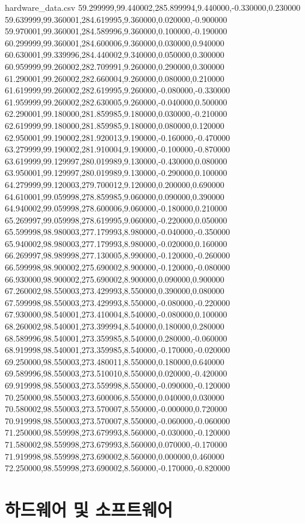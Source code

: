 \begin{filecontents}{hardware_data.csv}
59.299999,99.440002,285.899994,9.440000,-0.330000,0.230000
59.639999,99.360001,284.619995,9.360000,0.020000,-0.900000
59.970001,99.360001,284.589996,9.360000,0.100000,-0.190000
60.299999,99.360001,284.600006,9.360000,0.030000,0.940000
60.630001,99.339996,284.440002,9.340000,0.050000,0.300000
60.959999,99.260002,282.709991,9.260000,0.290000,0.300000
61.290001,99.260002,282.660004,9.260000,0.080000,0.210000
61.619999,99.260002,282.619995,9.260000,-0.080000,-0.330000
61.959999,99.260002,282.630005,9.260000,-0.040000,0.500000
62.290001,99.180000,281.859985,9.180000,0.030000,-0.210000
62.619999,99.180000,281.859985,9.180000,0.080000,0.120000
62.950001,99.190002,281.920013,9.190000,-0.160000,-0.470000
63.279999,99.190002,281.910004,9.190000,-0.100000,-0.870000
63.619999,99.129997,280.019989,9.130000,-0.430000,0.080000
63.950001,99.129997,280.019989,9.130000,-0.290000,0.100000
64.279999,99.120003,279.700012,9.120000,0.200000,0.690000
64.610001,99.059998,278.859985,9.060000,0.090000,0.390000
64.940002,99.059998,278.600006,9.060000,-0.180000,0.210000
65.269997,99.059998,278.619995,9.060000,-0.220000,0.050000
65.599998,98.980003,277.179993,8.980000,-0.040000,-0.350000
65.940002,98.980003,277.179993,8.980000,-0.020000,0.160000
66.269997,98.989998,277.130005,8.990000,-0.120000,-0.260000
66.599998,98.900002,275.690002,8.900000,-0.120000,-0.080000
66.930000,98.900002,275.690002,8.900000,0.090000,0.900000
67.260002,98.550003,273.429993,8.550000,0.390000,0.080000
67.599998,98.550003,273.429993,8.550000,-0.080000,-0.220000
67.930000,98.540001,273.410004,8.540000,-0.080000,0.100000
68.260002,98.540001,273.399994,8.540000,0.180000,0.280000
68.589996,98.540001,273.359985,8.540000,0.280000,-0.060000
68.919998,98.540001,273.359985,8.540000,-0.170000,-0.020000
69.250000,98.550003,273.480011,8.550000,0.180000,0.640000
69.589996,98.550003,273.510010,8.550000,0.020000,-0.420000
69.919998,98.550003,273.559998,8.550000,-0.090000,-0.120000
70.250000,98.550003,273.600006,8.550000,0.040000,0.030000
70.580002,98.550003,273.570007,8.550000,-0.000000,0.720000
70.919998,98.550003,273.570007,8.550000,-0.060000,-0.060000
71.250000,98.559998,273.679993,8.560000,-0.030000,-0.120000
71.580002,98.559998,273.679993,8.560000,0.070000,-0.170000
71.919998,98.559998,273.690002,8.560000,0.000000,0.460000
72.250000,98.559998,273.690002,8.560000,-0.170000,-0.820000
\end{filecontents}

\section{하드웨어 및 소프트웨어}  

